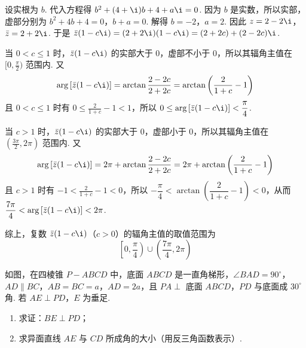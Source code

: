 \begin{solution}
设实根为 \(b\). 代入方程得 \(b^2+(4+\i)b+4+a\i=0\).
因为 \(b\) 是实数，所以实部，虚部分别为 \(b^2+4b+4=0\)，\(b+a=0\).
解得 \(b=-2\)，\(a=2\). 因此 \(z=2-2\i\)，\(\bar z=2+2\i\).
于是 \(\bar z(1-c\i)=(2+2\i)(1-c\i)=(2+2c)+(2-2c)\i\).

当 \(0<c\le1\) 时，\(\bar z(1-c\i)\) 的实部大于 \(0\)，虚部不小于 \(0\)，所以其辐角主值在 \([0,\frac{\pi}{2})\) 范围内.
又
\[
\arg\left[\bar z(1-c\i)\right]=\arctan\frac{2-2c}{2+2c}
=\arctan\left(\frac{2}{1+c}-1\right)
\]
且 \(0<c\le1\) 时有 \(0\le\frac{2}{1+c}-1<1\)，所以 \(0\le \arg\left[\bar z(1-c\i)\right]<\dfrac{\pi}{4}\).

当 \(c>1\) 时，\(\bar z(1-c\i)\) 的实部大于 \(0\)，虚部小于 \(0\)，所以其辐角主值在 \(\left(\frac{3\pi}{2},2\pi\right)\) 范围内.
又
\[
\arg\left[\bar z(1-c\i)\right]=2\pi+\arctan\frac{2-2c}{2+2c}
=2\pi+\arctan\left(\frac{2}{1+c}-1\right)
\]
且 \(c>1\) 时有 \(-1<\frac{2}{1+c}-1<0\)，所以 \(-\dfrac{\pi}{4}<\arctan\left(\dfrac{2}{1+c}-1\right)<0\)，从而 \(\dfrac{7\pi}{4}<\arg\left[\bar z(1-c\i)\right]<2\pi\).

综上，复数 \(\bar z(1-c\i)\)（\(c>0\)）的辐角主值的取值范围为
\[
\left[0,\frac{\pi}{4}\right)\cup\left(\frac{7\pi}{4},2\pi\right)
\]
\end{solution}

\begin{problem}
如图，在四棱锥 \(P-ABCD\) 中，底面 \(ABCD\) 是一直角梯形，\(\angle BAD = 90^\circ\)，\(AD \parallel BC\)，\(AB = BC = a\)，\(AD = 2a\)，且 \(PA \perp\) 底面 \(ABCD\)，\(PD\) 与底面成 \(30^\circ\) 角. 若 \(AE \perp PD\)，\(E\) 为垂足.

\begin{enumerate}
\item 求证：\(BE \perp PD\)；
\item 求异面直线 \(AE\) 与 \(CD\) 所成角的大小（用反三角函数表示）.
\end{enumerate}

\end{problem}

